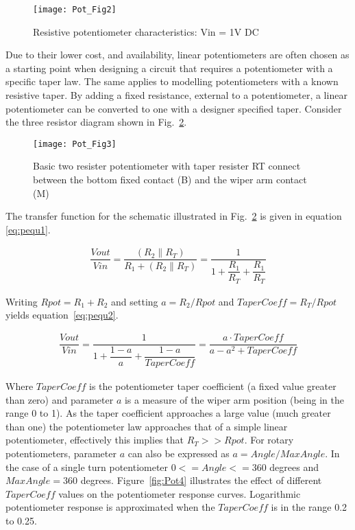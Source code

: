 \begin{figure} [h]
  \centering
  \texttt{[image: Pot\_Fig2]}
  \caption{Resistive potentiometer characteristics: Vin = 1V DC}
  \label{fig:Pot2}
\end{figure} 


Due to their lower cost, and availability, linear potentiometers are
often chosen as a starting point when designing a circuit that
requires a potentiometer with a specific taper law. The same applies
to modelling potentiometers with a known resistive taper. By adding a
fixed resistance, external to a potentiometer, a linear potentiometer
can be converted to one with a designer specified taper. Consider the
three resistor diagram shown in Fig.~\ref{fig:Pot3}.

\begin{figure} [h]
  \centering
  \texttt{[image: Pot\_Fig3]}
  \caption{Basic two resister potentiometer with taper resister RT connect between the bottom fixed contact (B) and the wiper arm contact (M)}
  \label{fig:Pot3} 
\end{figure} 

The transfer function for the schematic illustrated in
Fig.~\ref{fig:Pot3} is given in equation \eqref{eq:pequ1}.

\begin{align}
\label{eq:pequ1}
\dfrac{Vout}{Vin}=\dfrac{\left( R_{2} \parallel R_{T} \right) }{R_{1}+\left( R_{2} \parallel R_{T} \right) }
                 =\dfrac{1}{1+\dfrac{R_{1}}{R_{T}}+\dfrac{R_{1}}{R_{T}}}
\end{align}  

Writing $Rpot=R_{1}+R_{2}$ and setting $a=R_{2}/Rpot$ and
$TaperCoeff=R_{T}/Rpot$ yields equation~\eqref{eq:pequ2}.

\begin{align}
\label{eq:pequ2}
\dfrac{Vout}{Vin}=\dfrac{1}{1+\dfrac{1-a}{a}+\dfrac{1-a}{TaperCoeff}}=\dfrac{a \cdot TaperCoeff}{a - a^{2} +TaperCoeff}
\end{align}  

Where $TaperCoeff$ is the potentiometer taper coefficient (a fixed
value greater than zero) and parameter $a$ is a measure of the wiper
arm position (being in the range 0 to 1). As the taper coefficient
approaches a large value (much greater than one) the potentiometer law
approaches that of a simple linear potentiometer, effectively this
implies that $R_{T}>>Rpot$.  For rotary potentiometers, parameter $a$
can also be expressed as $a=Angle/MaxAngle$. In the case of a single
turn potentiometer $0 <= Angle <= 360$ degrees and $MaxAngle = 360$
degrees.  Figure~\ref{fig:Pot4} illustrates the effect of different
$TaperCoeff$ values on the potentiometer response curves.  Logarithmic
potentiometer response is approximated when the $TaperCoeff$ is in the
range 0.2 to 0.25.

